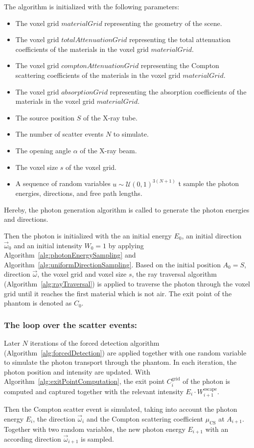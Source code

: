 The algorithm is initialized with the following parameters:
\begin{itemize}
    \item The voxel grid $materialGrid$ representing the geometry of the scene.
    \item The voxel grid $totalAttenuationGrid$ representing the total
    attenuation coefficients of the materials in the voxel grid $materialGrid$.
    \item The voxel grid $comptonAttenuationGrid$ representing the Compton
    scattering coefficients of the materials in the voxel grid $materialGrid$.
    \item The voxel grid $absorptionGrid$ representing the absorption
    coefficients of the materials in the voxel grid $materialGrid$.
    \item The source position $S$ of the X-ray tube.
    \item The number of scatter events $N$ to simulate.
    \item The opening angle $\alpha$ of the X-ray beam.
    \item The voxel size $s$ of the voxel grid.
    \item A sequence of random variables $u \sim \mathcal{U}(0, 1)^{3(N+1)}$ t
    sample the photon energies, directions, and free path lengths.
\end{itemize}

Hereby, the photon generation algorithm is called to generate the photon energies and directions.

Then the photon is initialized with the an initial energy $E_0$, an initial
direction $\vec{\omega}_0$ and an initial intensity $W_0=1$ by applying
Algorithm~\ref{alg:photonEnergySampling} and
Algorithm~\ref{alg:uniformDirectionSampling}. Based on the initial position $A_0
= S$, direction $\vec{\omega}$, the voxel grid and voxel size $s$, the ray
traversal algorithm (Algorithm~\ref{alg:rayTraversal}) is applied to traverse
the photon through the voxel grid until it reaches the first material which is
not air. The exit point of the phantom is denoted as $C_0$.

\subsubsection*{The loop over the scatter events:}

Later $N$ iterations of the forced detection algorithm
(Algorithm~\ref{alg:forcedDetection}) are applied together with one random
variable to simulate the photon transport through the phantom. In each
iteration, the photon position and intensity are updated. With
Algorithm~\ref{alg:exitPointComputation}, the exit point $C_i^\text{grid}$ of
the photon is computed and captured together with the relevant intensity $E_i
\cdot W^{\text{escape}}_{i+1}$.

Then the Compton scatter event is simulated, taking into account the photon
energy $E_i$, the direction $\vec{\omega}_i$ and the Compton scattering
coefficient $\mu_{\text{CS}}$ at $A_{i+1}$. Together with two random variables,
the new photon energy $E_{i+1}$ with an according direction $\vec{\omega}_{i+1}$
is sampled.
